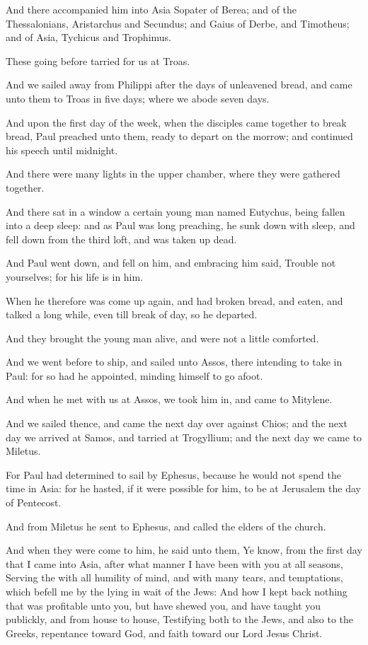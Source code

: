 \verse And there accompanied him into Asia Sopater of Berea; and of the Thessalonians, Aristarchus and Secundus; and Gaius of Derbe, and Timotheus; and of Asia, Tychicus and Trophimus.

\verse These going before tarried for us at Troas.

\verse And we sailed away from Philippi after the days of unleavened bread, and came unto them to Troas in five days; where we abode seven days.

\verse And upon the first day of the week, when the disciples came together to break bread, Paul preached unto them, ready to depart on the morrow; and continued his speech until midnight.

\verse And there were many lights in the upper chamber, where they were gathered together.

\verse And there sat in a window a certain young man named Eutychus, being fallen into a deep sleep: and as Paul was long preaching, he sunk down with sleep, and fell down from the third loft, and was taken up dead.

\verse And Paul went down, and fell on him, and embracing him said, Trouble not yourselves; for his life is in him.

\verse When he therefore was come up again, and had broken bread, and eaten, and talked a long while, even till break of day, so he departed.

\verse And they brought the young man alive, and were not a little comforted.

\verse And we went before to ship, and sailed unto Assos, there intending to take in Paul: for so had he appointed, minding himself to go afoot.

\verse And when he met with us at Assos, we took him in, and came to Mitylene.

\verse And we sailed thence, and came the next day over against Chios; and the next day we arrived at Samos, and tarried at Trogyllium; and the next day we came to Miletus.

\verse For Paul had determined to sail by Ephesus, because he would not spend the time in Asia: for he hasted, if it were possible for him, to be at Jerusalem the day of Pentecost.

\verse And from Miletus he sent to Ephesus, and called the elders of the church.

\verse And when they were come to him, he said unto them, Ye know, from the first day that I came into Asia, after what manner I have been with you at all seasons, \verse Serving the \LORD with all humility of mind, and with many tears, and temptations, which befell me by the lying in wait of the Jews: \verse And how I kept back nothing that was profitable unto you, but have shewed you, and have taught you publickly, and from house to house, \verse Testifying both to the Jews, and also to the Greeks, repentance toward God, and faith toward our Lord Jesus Christ.

